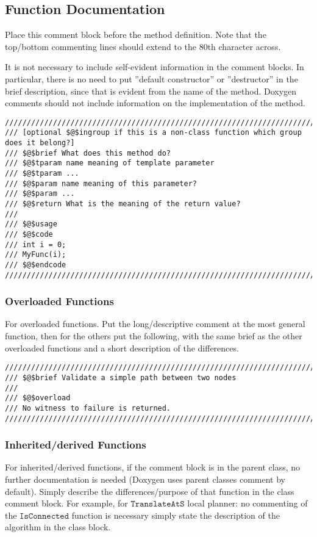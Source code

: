 \documentclass[12pt]{article}
\begin{document}
\subsection{Function Documentation}

Place this comment block before the method definition. Note that the top/bottom
commenting lines should extend to the 80th character across.

It is not necessary to include self-evident information in the comment blocks.
In particular, there is no need to put ”default constructor” or ”destructor” in
the brief description, since that is evident from the name of the method.
Doxygen comments should not include information on the implementation of the
method.

\begin{lstlisting}[mathescape]
////////////////////////////////////////////////////////////////////////////////
/// [optional $@$ingroup if this is a non-class function which group does it belong?]
/// $@$brief What does this method do?
/// $@$tparam name meaning of template parameter
/// $@$tparam ...
/// $@$param name meaning of this parameter?
/// $@$param ...
/// $@$return What is the meaning of the return value?
///
/// $@$usage
/// $@$code
/// int i = 0;
/// MyFunc(i);
/// $@$endcode
////////////////////////////////////////////////////////////////////////////////
\end{lstlisting}

\subsubsection{Overloaded Functions}

For overloaded functions. Put the long/descriptive comment at the most general
function, then for the others put the following, with the same brief as the
other overloaded functions and a short description of the differences.

\begin{lstlisting}[mathescape]
////////////////////////////////////////////////////////////////////////////////
/// $@$brief Validate a simple path between two nodes
///
/// $@$overload
/// No witness to failure is returned.
////////////////////////////////////////////////////////////////////////////////
\end{lstlisting}

\subsubsection{Inherited/derived Functions}
For inherited/derived functions, if the comment block is in the parent class,
no further documentation is needed (Doxygen uses parent classes comment by
default). Simply describe the differences/purpose of that function in the class
comment block. For example, for $\mathtt{TranslateAtS}$ local planner: no
commenting of the $\mathtt{IsConnected}$ function is necessary simply state the
description of the algorithm in the class block.
\end{document}
